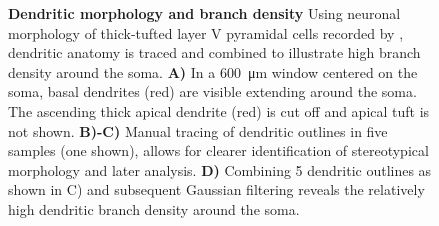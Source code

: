 \begin{figure}[!ht]
  \vfill
  \vspace{0.3cm}
  \caption{\textbf{Dendritic morphology and branch density}
    Using neuronal morphology of thick-tufted layer V
    pyramidal cells recorded by \textcite{Romand2011}, dendritic
    anatomy is traced and combined to illustrate high
    branch density around the soma. \textbf{A)} In a
    \SI{600}{\micro\meter} window centered on the soma, basal
    dendrites (red) are visible extending around the soma. The ascending
    thick apical dendrite (red) is cut off and apical tuft is not
    shown. \textbf{B)-C)} Manual tracing of dendritic outlines
    in five samples (one shown), allows for clearer identification of
    stereotypical morphology and later analysis. \textbf{D)} Combining
    5 dendritic outlines as shown in C) and subsequent Gaussian
    filtering reveals the relatively high dendritic branch density
    around the soma.
  }%
  \label{fig:dendrite_heat}
\end{figure}
\vspace{-0.2cm}

